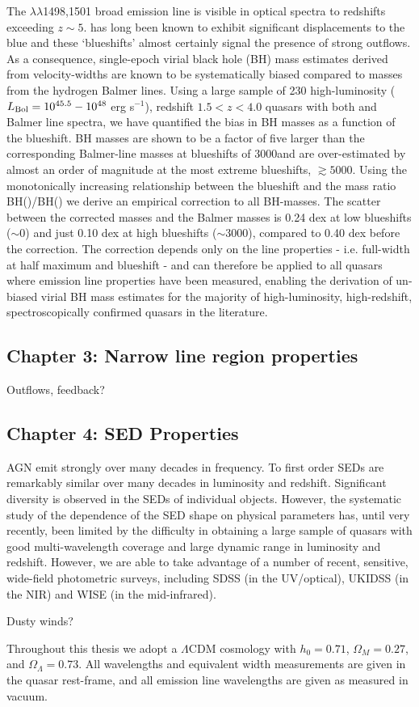 The $\lambda\lambda$1498,1501 broad emission line is visible in optical spectra to redshifts exceeding $z\sim5$. 
 has long been known to exhibit significant displacements to the blue and these `blueshifts' almost certainly signal the presence of strong outflows.
As a consequence, single-epoch virial black hole (BH) mass estimates derived from  velocity-widths are known to be systematically biased compared to masses from the hydrogen Balmer lines. 
Using a large sample of 230 high-luminosity ($L_{\rm Bol} = 10^{45.5}-10^{48}$ erg s$^{-1}$), redshift $1.5 < z < 4.0$ quasars with both  and Balmer line spectra, we have quantified the bias in  BH masses as a function of the  blueshift. 
 BH masses are shown to be a factor of five larger than the corresponding Balmer-line masses at  blueshifts of 3000\kms and are over-estimated by almost an order of magnitude at the most extreme blueshifts, $\gtrsim 5000$\kms.
Using the monotonically increasing relationship between the  blueshift and the mass ratio BH()/BH(\hans) we derive an empirical correction to all  BH-masses.
The scatter between the corrected  masses and the Balmer masses is 0.24 dex at low  blueshifts ($\sim$0\kms) and just 0.10 dex at high blueshifts ($\sim$3000\kms), compared to 0.40 dex before the correction. 
The correction depends only on the  line properties - i.e. full-width at half maximum and blueshift - and can therefore be applied to all quasars where  emission line properties have been measured, enabling the derivation of un-biased virial BH mass estimates for the majority of high-luminosity, high-redshift, spectroscopically confirmed quasars in the literature.

\subsection{Chapter 3: Narrow line region properties}

Outflows, feedback? 

\subsection{Chapter 4: SED Properties}

AGN emit strongly over many decades in frequency. 
To first order SEDs are remarkably similar over many decades in luminosity and redshift. 
Significant diversity is observed in the SEDs of individual objects. 
However, the systematic study of the dependence of the SED shape on physical parameters has, until very recently, been limited by the difficulty in obtaining a large sample of quasars with good multi-wavelength coverage and large dynamic range in luminosity and redshift. 
However, we are able to take advantage of a number of recent, sensitive, wide-field photometric surveys, including SDSS (in the UV/optical), UKIDSS (in the NIR) and WISE (in the mid-infrared).

Dusty winds?

Throughout this thesis we adopt a $\Lambda$CDM cosmology with $h_0=0.71$, $\Omega_M=0.27$, and $\Omega_\Lambda=0.73$. 
All wavelengths and equivalent width measurements are given in the quasar rest-frame, and all emission line wavelengths are given as measured in vacuum.
